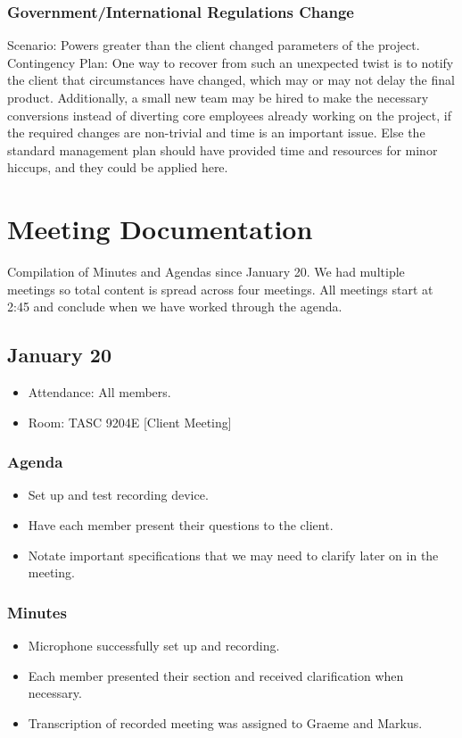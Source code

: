 \documentclass{article}
\begin{document}
\subsubsection{Government/International Regulations Change}
Scenario: Powers greater than the client changed parameters of the project.\\
Contingency Plan: One way to recover from such an unexpected twist is to 
notify the client that circumstances have changed, which may or may not 
delay the final product.  Additionally, a small new team may be hired to 
make the necessary conversions instead of diverting core employees already 
working on the project, if the required changes are non-trivial and time is 
an important issue.  Else the standard management plan should have provided 
time and resources for minor hiccups, and they could be applied here.


\section{Meeting Documentation}
Compilation of Minutes and Agendas since January 20.  We had multiple meetings
 so total content is spread across four meetings.  All meetings start at 2:45 
 and conclude when we have worked through the agenda.

\subsection{January 20}
\begin{itemize}
\item Attendance: All members.
\item Room: TASC 9204E [Client Meeting]
\end{itemize}
\subsubsection{Agenda}
\begin{itemize}
\item Set up and test recording device.
\item Have each member present their questions to the client.
\item Notate important specifications that we may need to clarify later on in
 the meeting.
\end{itemize}
\subsubsection{Minutes}
\begin{itemize}
\item Microphone successfully set up and recording.
\item Each member presented their section and received clarification 
when necessary.
\item Transcription of recorded meeting was assigned to Graeme and Markus.
\end{itemize}
\end{document}
